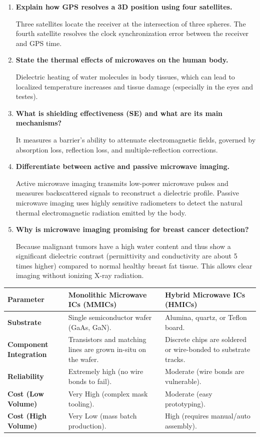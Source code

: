 \documentclass[12pt,a4paper]{article}
\newcommand{\Q}[1]{\textbf{#1}\par\noindent\ignorespaces}
\renewcommand{\arraystretch}{1.45}
\begin{document}
\begin{tcolorbox}[exambox, title={\textbf{Frequently Asked / Viva Questions}}]
\begin{enumerate}[topsep=0pt, label=\textbf{Q\arabic*.}, itemsep=5pt]
  \item \Q{Explain how GPS resolves a 3D position using four satellites.}
    Three satellites locate the receiver at the intersection of three spheres. The fourth satellite resolves the clock synchronization error between the receiver and GPS time.
  \item \Q{State the thermal effects of microwaves on the human body.}
    Dielectric heating of water molecules in body tissues, which can lead to localized temperature increases and tissue damage (especially in the eyes and testes).
  \item \Q{What is shielding effectiveness (SE) and what are its main mechanisms?}
    It measures a barrier's ability to attenuate electromagnetic fields, governed by absorption loss, reflection loss, and multiple-reflection corrections.
  \item \Q{Differentiate between active and passive microwave imaging.}
    Active microwave imaging transmits low-power microwave pulses and measures backscattered signals to reconstruct a dielectric profile. Passive microwave imaging uses highly sensitive radiometers to detect the natural thermal electromagnetic radiation emitted by the body.
  \item \Q{Why is microwave imaging promising for breast cancer detection?}
    Because malignant tumors have a high water content and thus show a significant dielectric contrast (permittivity and conductivity are about 5 times higher) compared to normal healthy breast fat tissue. This allows clear imaging without ionizing X-ray radiation.
\end{enumerate}
\end{tcolorbox}

\begin{tcolorbox}[tikzbox, title={Comparison of MMICs and Hybrid MICs}]
\renewcommand{\arraystretch}{1.4}
\par\noindent
{\renewcommand{\arraystretch}{1.55}%
\begin{tabularx}{\linewidth}{|B{3.2cm}|Y|Y|}\hline
\textbf{Parameter} & \textbf{Monolithic Microwave ICs (MMICs)} & \textbf{Hybrid Microwave ICs (HMICs)} \\[4pt]
\hline
\textbf{Substrate} & Single semiconductor wafer (GaAs, GaN). & Alumina, quartz, or Teflon board. \\
\hline
\textbf{Component Integration} & Transistors and matching lines are grown in-situ on the wafer. & Discrete chips are soldered or wire-bonded to substrate tracks. \\[4pt]
\hline
\textbf{Reliability} & Extremely high (no wire bonds to fail). & Moderate (wire bonds are vulnerable). \\[4pt]
\hline
\textbf{Cost (Low Volume)} & Very High (complex mask tooling). & Moderate (easy prototyping). \\
\hline
\textbf{Cost (High Volume)} & Very Low (mass batch production). & High (requires manual/auto assembly). \\[4pt]
\hline
\end{tabularx}
}
\end{tcolorbox}
\end{document}
